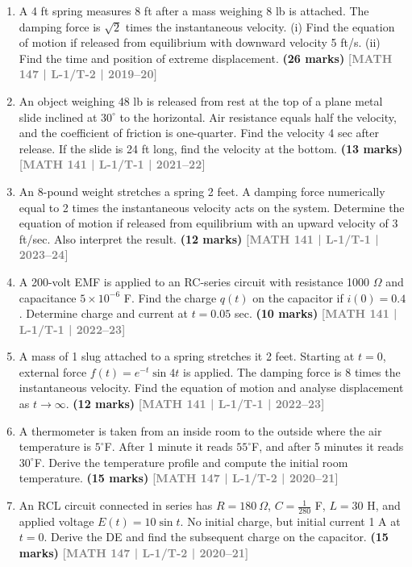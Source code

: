 \documentclass[12pt,a4paper]{article}
\newcommand{\yr}[1]{\hfill\textcolor{gray}{\small\textbf{[#1]}}}
\newcommand{\mk}[1]{\textcolor{orange!70!black}{\small\textbf{(#1 marks)}}}
\begin{document}
\begin{enumerate}
\item A 4 ft spring measures 8 ft after a mass weighing 8 lb is attached. The damping force is $\sqrt{2}$ times the instantaneous velocity. (i) Find the equation of motion if released from equilibrium with downward velocity 5 ft/s. (ii) Find the time and position of extreme displacement.
\mk{26} \yr{MATH 147 | L-1/T-2 | 2019--20}

\item An object weighing 48 lb is released from rest at the top of a plane metal slide inclined at $30^{\circ}$ to the horizontal. Air resistance equals half the velocity, and the coefficient of friction is one-quarter. Find the velocity 4 sec after release. If the slide is 24 ft long, find the velocity at the bottom.
\mk{13} \yr{MATH 141 | L-1/T-1 | 2021--22}

\item An 8-pound weight stretches a spring 2 feet. A damping force numerically equal to 2 times the instantaneous velocity acts on the system. Determine the equation of motion if released from equilibrium with an upward velocity of 3 ft/sec. Also interpret the result.
\mk{12} \yr{MATH 141 | L-1/T-1 | 2023--24}

\item A 200-volt EMF is applied to an RC-series circuit with resistance 1000 $\Omega$ and capacitance $5\times10^{-6}$ F. Find the charge $q(t)$ on the capacitor if $i(0)=0.4$. Determine charge and current at $t=0.05$ sec.
\mk{10} \yr{MATH 141 | L-1/T-1 | 2022--23}

\item A mass of 1 slug attached to a spring stretches it 2 feet. Starting at $t=0$, external force $f(t)=e^{-t}\sin 4t$ is applied. The damping force is 8 times the instantaneous velocity. Find the equation of motion and analyse displacement as $t\to\infty$.
\mk{12} \yr{MATH 141 | L-1/T-1 | 2022--23}

\item A thermometer is taken from an inside room to the outside where the air temperature is $5^{\circ}$F. After 1 minute it reads $55^{\circ}$F, and after 5 minutes it reads $30^{\circ}$F. Derive the temperature profile and compute the initial room temperature.
\mk{15} \yr{MATH 147 | L-1/T-2 | 2020--21}

\item An RCL circuit connected in series has $R=180\ \Omega$, $C=\tfrac{1}{280}$ F, $L=30$ H, and applied voltage $E(t)=10\sin t$. No initial charge, but initial current 1 A at $t=0$. Derive the DE and find the subsequent charge on the capacitor.
\mk{15} \yr{MATH 147 | L-1/T-2 | 2020--21}

\end{enumerate}
\end{document}
